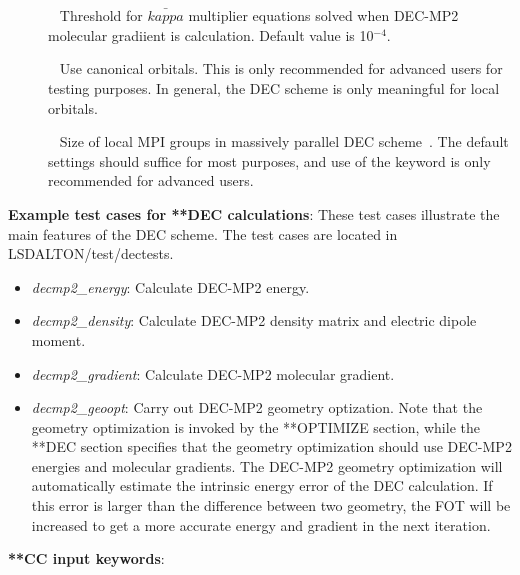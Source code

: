 \begin{description}
\item[] \verb| | \newline
Threshold for $\bar{kappa}$ multiplier equations solved when DEC-MP2 molecular gradiient is calculation. Default value is 10$^{-4}$.


\item[] \verb| | \newline
Use canonical orbitals. This is only recommended for advanced users for testing purposes. In general, the DEC scheme is only meaningful for local orbitals.

\item[] \verb| | \newline
Size of local MPI groups in massively parallel DEC scheme~\cite{dec6}. The default settings should suffice for most purposes, and use of the keyword is only recommended for advanced users.


\end{description}

\vspace{1 cm}
\noindent
\textbf{Example test cases for **DEC calculations}: \newline
These test cases illustrate the main features of the DEC scheme. The test cases are located in LSDALTON/test/dectests.

\begin{itemize}
\item
\textit{decmp2\_energy}: Calculate DEC-MP2 energy.
\item
\textit{decmp2\_density}: Calculate DEC-MP2 density matrix and electric dipole moment.
\item
\textit{decmp2\_gradient}: Calculate DEC-MP2 molecular gradient.
\item
\textit{decmp2\_geoopt}: Carry out DEC-MP2 geometry optization. Note that the geometry optimization is invoked by the **OPTIMIZE section, while the **DEC section specifies that the geometry optimization should use DEC-MP2 energies and molecular gradients. The DEC-MP2 geometry optimization will automatically estimate the intrinsic energy error of the DEC calculation. If this error is larger than the difference between two geometry, the FOT will be increased to get a more accurate energy and gradient in the next iteration.
\end{itemize}


\vspace{1 cm}
\noindent
\textbf{**CC input keywords}:

